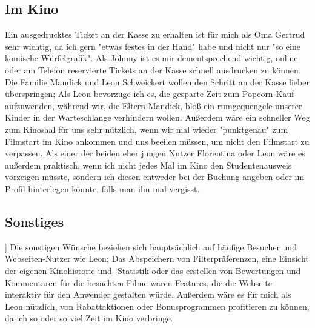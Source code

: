 \subsection{Im Kino}
Ein ausgedrucktes Ticket an der Kasse zu erhalten ist für mich als Oma Gertrud sehr wichtig, da ich gern "etwas festes in der Hand" habe und nicht nur "so eine komische Würfelgrafik". Als Johnny ist es mir dementsprechend wichtig, online oder am Telefon reservierte Tickets an der Kasse schnell ausdrucken zu können. Die Familie Mandick und Leon Schweickert wollen den Schritt an der Kasse lieber überspringen; Als Leon bevorzuge ich es, die gesparte Zeit zum Popcorn-Kauf aufzuwenden, während wir, die Eltern Mandick, bloß ein rumgequengele unserer Kinder in der Warteschlange verhindern wollen. Außerdem wäre ein schneller Weg zum Kinosaal für uns sehr nützlich, wenn wir mal wieder "punktgenau" zum Filmstart im Kino ankommen und uns beeilen müssen, um nicht den Filmstart zu verpassen. Als einer der beiden eher jungen Nutzer Florentina oder Leon wäre es außerdem praktisch, wenn ich nicht jedes Mal im Kino den Studentenausweis vorzeigen müsste, sondern ich diesen entweder bei der Buchung angeben oder im Profil hinterlegen könnte, falls man ihn mal vergisst.

\subsection{Sonstiges}]
Die sonstigen Wünsche beziehen sich hauptsächlich auf häufige Besucher und Webseiten-Nutzer wie Leon; Das Abspeichern von Filterpräferenzen, eine Einsicht der eigenen Kinohistorie und -Statistik oder das erstellen von Bewertungen und Kommentaren für die besuchten Filme wären Features, die die Webseite interaktiv für den Anwender gestalten würde. Außerdem wäre es für mich als Leon nützlich, von Rabattaktionen oder Bonusprogrammen profitieren zu können, da ich so oder so viel Zeit im Kino verbringe.

